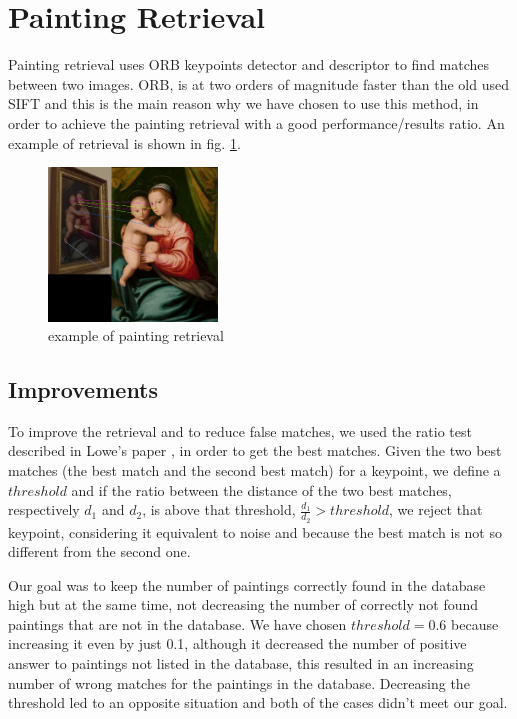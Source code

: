 \section{Painting Retrieval}
Painting retrieval uses ORB \cite{orb} keypoints detector and descriptor to find matches between two images. ORB, is at two orders of magnitude faster than the old used SIFT \cite{sift} and this is the main reason why we have chosen to use this method, in order to achieve the painting retrieval with a good performance/results ratio.
An example of retrieval is shown in fig. \ref{fig:retrieval_ex}.
\begin{figure}[h!]
  \centering
      \includegraphics[width=0.4\textwidth]{pictures/painting_retrieval/retrieval}
  \caption{example of painting retrieval}
  \label{fig:retrieval_ex}
\end{figure}

\subsection{Improvements}
To improve the retrieval and to reduce false matches, we used the ratio test described in Lowe's paper \cite{sift}, in order to get the best matches. Given the two best matches (the best match and the second best match) for a keypoint, we define a \(threshold\) and if the ratio between the distance of the two best matches, respectively \(d_1\) and \(d_2\), is above that threshold, \(\frac{d_1}{d_2}>threshold\), we reject that keypoint, considering it equivalent to noise and because the best match is not so different from the second one. 

Our goal was to keep the number of paintings correctly found in the database high but at the same time, not decreasing the number of correctly not found paintings that are not in the database. We have chosen \(threshold = 0.6\) because increasing it even by just 0.1, although it decreased the number of positive answer to paintings not listed in the database, this resulted in an increasing number of wrong matches for the paintings in the database. Decreasing the threshold led to an opposite situation and both of the cases didn't meet our goal.

